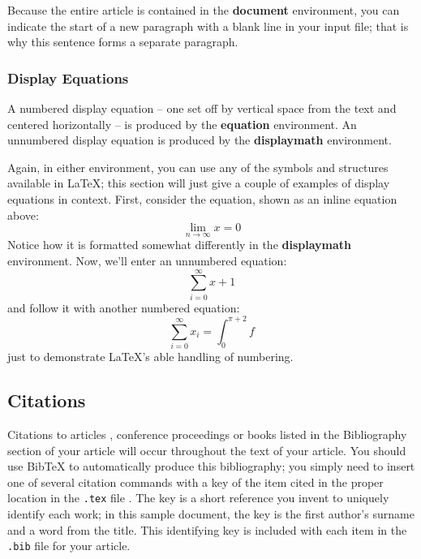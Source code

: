 \documentclass{acm_proc_article-sp}
\begin{document}
Because the entire article is contained in
the \textbf{document} environment, you can indicate the
start of a new paragraph with a blank line in your
input file; that is why this sentence forms a separate paragraph.

\subsubsection{Display Equations}
A numbered display equation -- one set off by vertical space
from the text and centered horizontally -- is produced
by the \textbf{equation} environment. An unnumbered display
equation is produced by the \textbf{displaymath} environment.

Again, in either environment, you can use any of the symbols
and structures available in \LaTeX; this section will just
give a couple of examples of display equations in context.
First, consider the equation, shown as an inline equation above:
\begin{equation}\lim_{n\rightarrow \infty}x=0\end{equation}
Notice how it is formatted somewhat differently in
the \textbf{displaymath}
environment.  Now, we'll enter an unnumbered equation:
\begin{displaymath}\sum_{i=0}^{\infty} x + 1\end{displaymath}
and follow it with another numbered equation:
\begin{equation}\sum_{i=0}^{\infty}x_i=\int_{0}^{\pi+2} f\end{equation}
just to demonstrate \LaTeX's able handling of numbering.

\subsection{Citations}
Citations to articles \cite{bowman:reasoning, clark:pct, braams:babel, herlihy:methodology},
conference
proceedings \cite{clark:pct} or books \cite{salas:calculus, Lamport:LaTeX} listed
in the Bibliography section of your
article will occur throughout the text of your article.
You should use BibTeX to automatically produce this bibliography;
you simply need to insert one of several citation commands with
a key of the item cited in the proper location in
the \texttt{.tex} file \cite{Lamport:LaTeX}.
The key is a short reference you invent to uniquely
identify each work; in this sample document, the key is
the first author's surname and a
word from the title.  This identifying key is included
with each item in the \texttt{.bib} file for your article.
\end{document}
